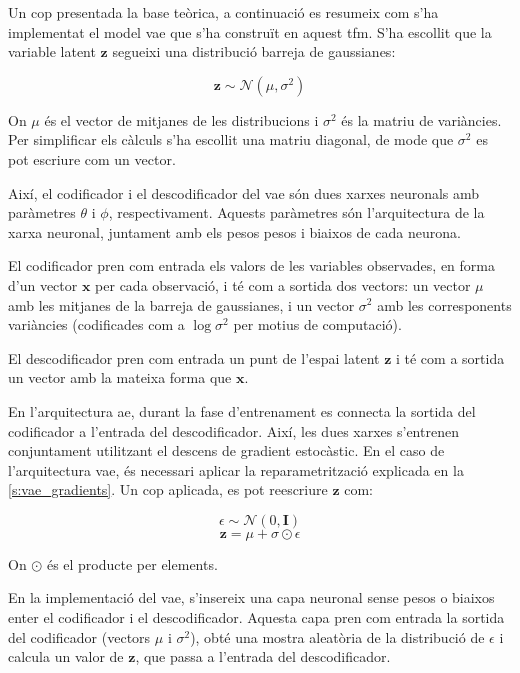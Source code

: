 \documentclass[CAT,BIB]{TFUOC}%
\begin{document}
            Un cop presentada la base teòrica,
            a continuació es resumeix com s'ha implementat el model \gls{vae}
            que s'ha construït en aquest \gls{tfm}.
            S'ha escollit que la variable latent $\mathbf{z}$
            segueixi una distribució barreja de gaussianes:

            $$\mathbf{z} \sim \mathcal{N}(\mu, \sigma^2)$$

            On $\mu$ és el vector de mitjanes de les distribucions
            i $\sigma^2$ és la matriu de variàncies.
            Per simplificar els càlculs s'ha escollit una matriu diagonal,
            de mode que $\sigma^2$ es pot escriure com un vector.

            Així, el codificador i el descodificador del \gls{vae} són
            dues xarxes neuronals amb paràmetres $\theta$ i $\phi$, respectivament.
            Aquests paràmetres són l'arquitectura de la xarxa neuronal,
            juntament amb els pesos pesos i biaixos de cada neurona.

            El codificador pren com entrada els valors de les variables observades,
            en forma d'un vector $\mathbf{x}$ per cada observació,
            i té com a sortida dos vectors:
            un vector $\mu$ amb les mitjanes de la barreja de gaussianes,
            i un vector $\sigma^2$ amb les corresponents variàncies
            (codificades com a $\log \sigma^2$ per motius de computació).

            El descodificador pren com entrada un punt de l'espai latent $\mathbf{z}$
            i té com a sortida un vector amb la mateixa forma que $\mathbf{x}$.

            En l'arquitectura \gls{ae},
            durant la fase d'entrenament
            es connecta la sortida del codificador a l'entrada del descodificador.
            Així, les dues xarxes s'entrenen conjuntament
            utilitzant el descens de gradient estocàstic.
            En el caso de l'arquitectura \gls{vae},
            és necessari aplicar la reparametrització
            explicada en la \cref{s:vae_gradients}.
            Un cop aplicada, es pot reescriure $\mathbf{z}$ com:

            $$\epsilon \sim \mathcal{N}(0, \mathbf{I})$$
            $$\mathbf{z} = \mu + \sigma \odot \epsilon$$

            On $\odot$ és el producte per elements.

            En la implementació del \gls{vae},
            s'insereix una capa neuronal sense pesos o biaixos
            enter el codificador i el descodificador.
            Aquesta capa pren com entrada la sortida del codificador
            (vectors $\mu$ i $\sigma^2$),
            obté una mostra aleatòria de la distribució de $\epsilon$
            i calcula un valor de $\mathbf{z}$,
            que passa a l'entrada del descodificador.
\end{document}
